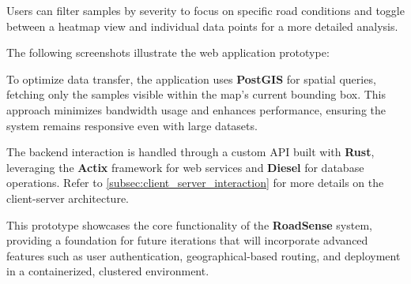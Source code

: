 \noindent Users can filter samples by severity to focus on specific road conditions and toggle between a heatmap view and individual data points for a more detailed analysis.

The following screenshots illustrate the web application prototype:




To optimize data transfer, the application uses \textbf{PostGIS} for spatial queries, fetching only the samples visible within the map's current bounding box. This approach minimizes bandwidth usage and enhances performance, ensuring the system remains responsive even with large datasets.

The backend interaction is handled through a custom API built with \textbf{Rust}, leveraging the \textbf{Actix} framework for web services and \textbf{Diesel} for database operations. Refer to \autoref{subsec:client_server_interaction} for more details on the client-server architecture.

This prototype showcases the core functionality of the \textbf{RoadSense} system, providing a foundation for future iterations that will incorporate advanced features such as user authentication, geographical-based routing, and deployment in a containerized, clustered environment.
